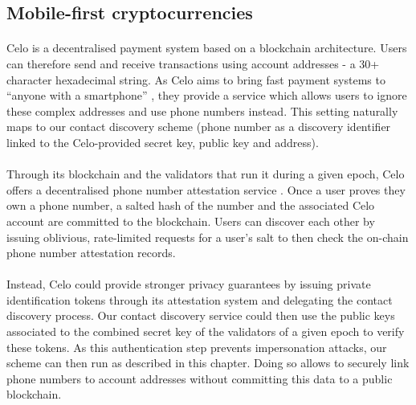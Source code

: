 	\subsection{Mobile-first cryptocurrencies}
	
	\paragraph{} Celo is a decentralised payment system based on a blockchain architecture. Users can therefore send and receive transactions using account addresses - a 30+ character hexadecimal string. As Celo aims to bring fast payment systems to ``anyone with a smartphone'' \cite{Celo:Doc}, they provide a service which allows users to ignore these complex addresses and use phone numbers instead. This setting naturally maps to our contact discovery scheme (phone number as a discovery identifier linked to the Celo-provided secret key, public key and address).
	
	\paragraph{} Through its blockchain and the validators that run it during a given epoch, Celo offers a decentralised phone number attestation service \cite{Celo:Phone}. Once a user proves they own a phone number, a salted hash of the number and the associated Celo account are committed to the blockchain. Users can discover each other by issuing oblivious, rate-limited requests for a user's salt to then check the on-chain phone number attestation records.	
	
	\paragraph{} Instead, Celo could provide stronger privacy guarantees by issuing private identification tokens through its attestation system and delegating the contact discovery process. Our contact discovery service could then use the public keys associated to the combined secret key of the validators of a given epoch to verify these tokens. As this authentication step prevents impersonation attacks, our scheme can then run as described in this chapter. Doing so allows to securely link phone numbers to account addresses without committing this data to a public blockchain.
	
	
	
	
	
	
	
	
	
	
	
	
	
	
	
	
	
	
	
	
	
	
	
	
